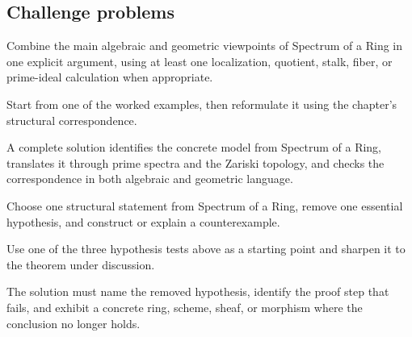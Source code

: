 \subsection*{Challenge problems}

\begin{exercise}\label{exr:vi07-expand-15}
Combine the main algebraic and geometric viewpoints of Spectrum of a Ring in one explicit argument, using at least one localization, quotient, stalk, fiber, or prime-ideal calculation when appropriate.
\end{exercise}
\begin{hint}
Start from one of the worked examples, then reformulate it using the chapter's structural correspondence.
\end{hint}
\begin{solution}
A complete solution identifies the concrete model from Spectrum of a Ring, translates it through prime spectra and the Zariski topology, and checks the correspondence in both algebraic and geometric language.
\end{solution}

\begin{exercise}\label{exr:vi07-expand-16}
Choose one structural statement from Spectrum of a Ring, remove one essential hypothesis, and construct or explain a counterexample.
\end{exercise}
\begin{hint}
Use one of the three hypothesis tests above as a starting point and sharpen it to the theorem under discussion.
\end{hint}
\begin{solution}
The solution must name the removed hypothesis, identify the proof step that fails, and exhibit a concrete ring, scheme, sheaf, or morphism where the conclusion no longer holds.
\end{solution}

